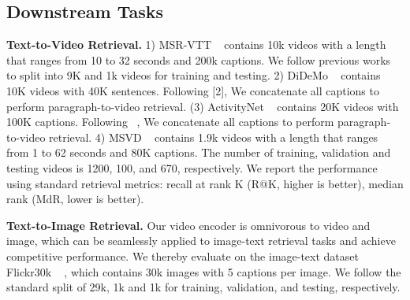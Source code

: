 \documentclass[10pt,twocolumn,letterpaper]{article}
\begin{document}
\vspace{-1mm}\subsection{Downstream Tasks}

\noindent\textbf{Text-to-Video Retrieval.} 1) MSR-VTT ~\cite{msrvtt} contains 10k videos with a length that ranges from 10 to 32 seconds and 200k captions. We follow previous works ~\cite{Frozen, taco} to split into 9K and 1k videos for training and testing. 2) DiDeMo ~\cite{didemo} contains 10K videos with 40K sentences. Following [2], We concatenate all captions to perform paragraph-to-video retrieval. (3) ActivityNet ~\cite{activitynet} contains 20K videos with 100K captions. Following ~\cite{clipbert}, We concatenate all captions to perform paragraph-to-video retrieval. 4) MSVD ~\cite{msvd} contains 1.9k videos with a length that ranges from 1 to 62 seconds and 80K captions. The number of training, validation and testing videos is 1200, 100, and 670, respectively. We report the performance using standard retrieval metrics: recall at rank K (R@K, higher is better), median rank (MdR, lower is better).

\vspace{1mm}\noindent\textbf{Text-to-Image Retrieval.} Our video encoder is omnivorous to video and image, which can be seamlessly applied to image-text retrieval tasks and achieve competitive performance. We thereby evaluate on the image-text dataset Flickr30k ~\cite{flickr30k} , which contains 30k images with 5 captions per image. We follow the standard split of 29k, 1k and 1k for training, validation, and testing, respectively.
\end{document}
